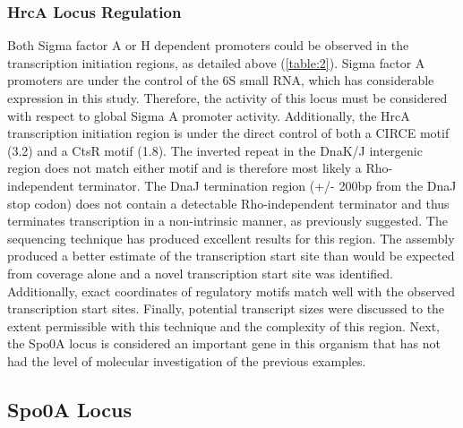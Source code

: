 \subsubsection{HrcA Locus Regulation}
Both Sigma factor A or H dependent promoters could be observed in the transcription initiation regions, as detailed above (\ref{table:2}). Sigma factor A promoters are under the control of the 6S small RNA, which has considerable expression in this study. Therefore, the activity of this locus must be considered with respect to global Sigma A promoter activity. Additionally, the HrcA transcription initiation region is under the direct control of both a CIRCE motif (3.2) and a CtsR motif (1.8)\cite{42}. The inverted repeat in the DnaK/J intergenic region does not match either motif and is therefore most likely a Rho-independent terminator. The DnaJ termination region (+/- 200bp from the DnaJ stop codon) does not contain a detectable Rho-independent terminator and thus terminates transcription in a non-intrinsic manner, as previously suggested\cite{83}. The sequencing technique has produced excellent results for this region. The assembly produced a better estimate of the transcription start site than would be expected from coverage alone and a novel transcription start site was identified. Additionally, exact coordinates of regulatory motifs match well with the observed transcription start sites. Finally, potential transcript sizes were discussed to the extent permissible with this technique and the complexity of this region. Next, the Spo0A locus is considered an important gene in this organism that has not had the level of molecular investigation of the previous examples.




\subsection{Spo0A Locus}

